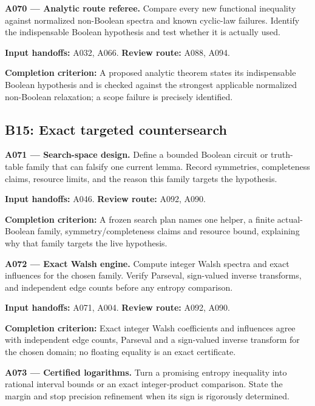\documentclass[11pt]{article}
\begin{document}
\textbf{A070 --- Analytic route referee.} Compare every new functional inequality against normalized non-Boolean spectra and known cyclic-law failures. Identify the indispensable Boolean hypothesis and test whether it is actually used.

{\small\color{ink}\textbf{Input handoffs:} A032, A066. \textbf{Review route:} A088, A094.\par
\textbf{Completion criterion:} A proposed analytic theorem states its indispensable Boolean hypothesis and is checked against the strongest applicable normalized non-Boolean relaxation; a scope failure is precisely identified.\par}



\subsection{B15: Exact targeted countersearch}

\textbf{A071 --- Search-space design.} Define a bounded Boolean circuit or truth-table family that can falsify one current lemma. Record symmetries, completeness claims, resource limits, and the reason this family targets the hypothesis.

{\small\color{ink}\textbf{Input handoffs:} A046. \textbf{Review route:} A092, A090.\par
\textbf{Completion criterion:} A frozen search plan names one helper, a finite actual-Boolean family, symmetry/completeness claims and resource bound, explaining why that family targets the live hypothesis.\par}



\textbf{A072 --- Exact Walsh engine.} Compute integer Walsh spectra and exact influences for the chosen family. Verify Parseval, sign-valued inverse transforms, and independent edge counts before any entropy comparison.

{\small\color{ink}\textbf{Input handoffs:} A071, A004. \textbf{Review route:} A092, A090.\par
\textbf{Completion criterion:} Exact integer Walsh coefficients and influences agree with independent edge counts, Parseval and a sign-valued inverse transform for the chosen domain; no floating equality is an exact certificate.\par}



\textbf{A073 --- Certified logarithms.} Turn a promising entropy inequality into rational interval bounds or an exact integer-product comparison. State the margin and stop precision refinement when its sign is rigorously determined.
\end{document}
